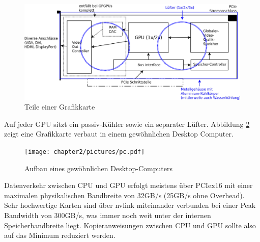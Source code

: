 		\begin{figure}[h]
			\centering
    		    \includegraphics[width=\textwidth]{chapter2/pictures/gpu.pdf}
    		    \caption[Grafikkarte]{Teile einer Grafikkarte}
    		    \label{2:graka}
		\end{figure}
		
		Auf jeder GPU sitzt ein passiv-Kühler sowie ein separater Lüfter. Abbildung \ref{2:gpucpu} zeigt eine Grafikkarte verbaut in einem gewöhnlichen Desktop Computer.
		
		\newpage
		
		\begin{figure}[h]
			\centering
    		    \texttt{[image: chapter2/pictures/pc.pdf]}
    		    \caption[Desktop PC]{Aufbau eines gewöhnlichen Desktop-Computers}
    		    \label{2:gpucpu}
		\end{figure}
		
		Datenverkehr zwischen CPU und GPU erfolgt meistens über \Gls{PCIe}x16 mit einer maximalen physikalischen Bandbreite von 32GB/s (25GB/s ohne Overhead). Sehr hochwertige Karten sind über \gls{nvlink} miteinander verbunden bei einer \Gls{Peak Bandwidth} von 300GB/s, was immer noch weit unter der internen Speicherbandbreite liegt. Kopieranweisungen zwischen CPU und GPU sollte also auf das Minimum reduziert werden.
		
